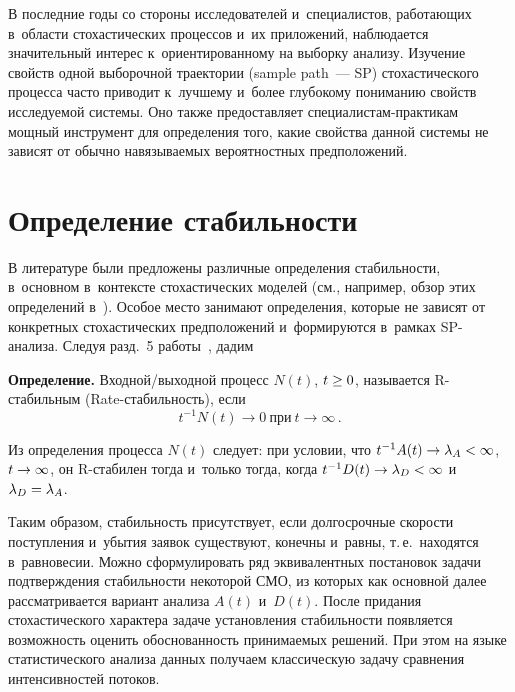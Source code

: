 \begin{multicols}{2}
     В последние годы со стороны исследователей и~специалистов, ра\-бо\-та\-ющих в~области стохастических процессов и~их приложений, наблюдается значительный 
интерес к~ориентированному на выборку анализу. Изучение свойств одной 
выборочной траектории (sample path~--- SP) стохастического процесса час\-то 
приводит к~лучшему и~более глубокому пониманию свойств ис\-сле\-ду\-емой 
сис\-те\-мы. Оно также предоставляет спе\-циа\-ли\-стам-прак\-ти\-кам мощный 
инструмент для определения того, какие свойства данной сис\-те\-мы не зависят от 
обычно навязываемых вероятностных предположений. 

\vspace*{-4pt}

\section{Определение стабильности}

\vspace*{-1pt}
     
     В литературе были предложены различные определения ста\-биль\-ности, 
     в~основном в~контексте сто\-ха\-сти\-че\-ских моделей (см., например, обзор этих 
определений в~\cite[приложение~C]{3-kri}). Особое мес\-то занимают определения, 
которые не зависят от конкретных сто\-ха\-сти\-че\-ских предположений и~формируются 
в~рам\-ках SP-ана\-ли\-за. Следуя разд.~5 работы~\cite{3-kri}, дадим
     
     \smallskip
     
     \noindent
     \textbf{Определение.} Вход\-ной/вы\-ход\-ной процесс $N(t)$, $t\hm\geq 0$, 
называется R-ста\-биль\-ным (Rate-ста\-биль\-ность), если 
     $$
     t^{-1} N(t)\to 0\ \mbox{при}\ t\to \infty\,.
     $$
     
     \vspace*{-3pt}
     
     \noindent
Из определения процесса $N(t)$ следует: при условии, что $t^{-1}A(t)\hm\to 
\lambda_A\hm< \infty$, $t\hm\to \infty$, он R-ста\-би\-лен тогда и~только тогда, 
когда $t^{-1}D(t)\hm\to \lambda_D \hm< \infty$ и~$\lambda_D\hm= \lambda_A$. 

\smallskip
     
     Таким образом, стабильность присутствует, если долгосрочные скорости 
по\-ступ\-ле\-ния и~убытия заявок существуют, конечны и~рав\-ны, т.\,е.\ находятся 
в~равновесии. Можно сформулировать ряд эквивалентных по\-ста\-но\-вок задачи 
под\-тверж\-де\-ния ста\-биль\-ности некоторой СМО, из которых как основной далее 
рас\-смат\-ри\-ва\-ет\-ся вариант анализа $A(t)$ и~$D(t)$. После придания стохастического 
характера задаче установления стабильности появляется воз\-мож\-ность оценить 
обосно\-ван\-ность при\-ни\-ма\-емых решений. При этом на языке статистического 
анализа данных получаем классическую задачу сравнения интенсивностей 
потоков. 
     

\end{multicols}
